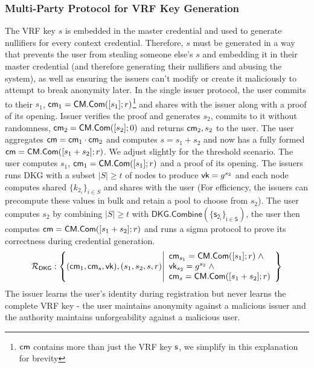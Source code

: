 \subsubsection{Multi-Party Protocol for VRF Key Generation}\label{t-siris:vrf-key-k-gen}
The VRF key $s$ is embedded in the master credential and used to generate nullifiers for every context credential. Therefore, $s$ must be generated in a way that prevents the user from stealing someone else's $s$ and embedding it in their master credential (and therefore generating their nullifiers and abusing the system), as well as ensuring the issuers can't modify or create it maliciously to attempt to break anonymity later.
In the single issuer protocol, the user commits to their $s_1$, $\mathsf{cm}_1 = \mathsf{CM.Com}([s_1];r)$\footnote{$\mathsf{cm}$ contains more than just the VRF key $\mathsf{s}$, we simplify in this explanation for brevity} and shares with the issuer along with a proof of its opening. Issuer verifies the proof and generates $s_2$, commits to it without randomness, $\mathsf{cm}_2 = \mathsf{CM.Com}([s_2];0)$ and returns $\mathsf{cm}_2, s_2$ to the user. The user aggregates $\mathsf{cm} = \mathsf{cm}_1 \cdot \mathsf{cm}_2$ and computes $s =  s_1 + s_2$ and now has a fully formed $\mathsf{cm} = \mathsf{CM.Com}([s_1 + s_2];r)$.
We adjust slightly for the threshold scenario. 
The user computes $s_1$, $\mathsf{cm}_1 = \mathsf{CM.Com}([s_1];r)$ and a proof of its opening.
The issuers runs DKG with a subset  $|S| \geq t$ of nodes to produce $\mathsf{vk} = g^{s_2}$ and each node computes shared $\{k_{2_i}\}_{i \in S}$ and shares with the user (For efficiency, the issuers can precompute these values in bulk and retain a pool to choose from $s_2$).
The user computes $s_2$ by combining $|S| \geq t$ with $\mathsf{DKG.Combine(\{s_{2_i}\}_{i \in S})}$, the user then computes $\mathsf{cm} = \mathsf{CM.Com}([s_1 + s_2];r)$ and runs a sigma protocol to prove its correctness during credential generation. 
\[
\mathcal{R}_{\mathsf{DKG}}: \left\{ 
(\mathsf{cm}_1, \mathsf{cm}_s, \mathsf{vk}),(s_1, s_2, s, r) 
\middle| 
\begin{array}{lcl}
    \mathsf{cm}_{s_1} = \mathsf{CM.Com}([s_1];r) \; \wedge \; \\
    \mathsf{vk}_{s_2} = g^{s_2} \; \wedge \; \\
    \mathsf{cm}_s = \mathsf{CM.Com}([s_1 + s_2];r)
\end{array} \right\}
\]
The issuer learns the user's identity during registration but never learns the complete VRF key - the user maintains anonymity against a malicious issuer and the authority maintains unforgeability against a malicious user.

